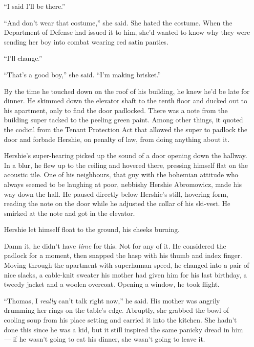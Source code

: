 ``I said I'll be there.''

``And don't wear that costume,'' she said. She hated the costume.
When the Department of Defense had issued it to him, she'd wanted
to know why they were sending her boy into combat wearing red satin
panties.

``I'll change.''

``That's a good boy,'' she said. ``I'm making brisket.''

\tb

By the time he touched down on the roof of his building, he knew
he'd be late for dinner. He skimmed down the elevator shaft to the
tenth floor and ducked out to his apartment, only to find the door
padlocked. There was a note from the building super tacked to the
peeling green paint. Among other things, it quoted the codicil from
the Tenant Protection Act that allowed the super to padlock the
door and forbade Hershie, on penalty of law, from doing anything
about it.

Hershie's super-hearing picked up the sound of a door opening down
the hallway. In a blur, he flew up to the ceiling and hovered
there, pressing himself flat on the acoustic tile. One of his
neighbours, that guy with the bohemian attitude who always seemed
to be laughing at poor, nebbishy Hershie Abromowicz, made his way
down the hall. He paused directly below Hershie's still, hovering
form, reading the note on the door while he adjusted the collar of
his ski-vest. He smirked at the note and got in the elevator.

Hershie let himself float to the ground, his cheeks burning.

Damn it, he didn't have \emph{time} for this. Not for any of it. He
considered the padlock for a moment, then snapped the hasp with his
thumb and index finger. Moving through the apartment with
superhuman speed, he changed into a pair of nice slacks, a
cable-knit sweater his mother had given him for his last birthday,
a tweedy jacket and a woolen overcoat. Opening a window, he took
flight.

\tb

``Thomas, I \emph{really} can't talk right now,'' he said. His
mother was angrily drumming her rings on the table's edge.
Abruptly, she grabbed the bowl of cooling soup from his place
setting and carried it into the kitchen. She hadn't done this since
he was a kid, but it still inspired the same panicky dread in him
--- if he wasn't going to eat his dinner, she wasn't going to leave
it.

